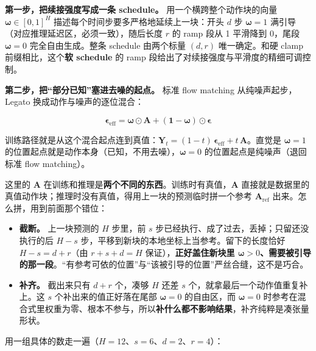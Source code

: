 \documentclass[
  chinese,
]{ctexart}
\providecommand{\tightlist}{%
  \setlength{\itemsep}{0pt}\setlength{\parskip}{0pt}}
\begin{document}
\textbf{第一步，把续接强度写成一条 schedule。}
用一个横跨整个动作块的向量 \(\boldsymbol{\omega} \in [0,1]^H\)
描述每个时间步要多严格地延续上一块：开头 \(d\) 步
\(\boldsymbol{\omega} = 1\) 满引导（对应推理延迟区，必须一致），随后长度
\(r\) 的 ramp 段从 1 平滑降到 0，尾段 \(\boldsymbol{\omega} = 0\)
完全自由生成。整条 schedule 由两个标量 \((d, r)\) 唯一确定。和硬 clamp
前缀相比，这个\textbf{软 schedule} 的 ramp
段给出了对续接强度与平滑度的精细可调控制。

\textbf{第二步，把``部分已知''塞进去噪的起点。} 标准 flow matching
从纯噪声起步，Legato 换成动作与噪声的逐位混合：

\[\boldsymbol{\epsilon}_{\mathrm{eff}} = \boldsymbol{\omega} \odot \mathbf{A} + (\mathbf{1} - \boldsymbol{\omega}) \odot \boldsymbol{\epsilon}\]

训练路径就是从这个混合起点连到真值：\(\mathbf{Y}_t = (1-t)\,\boldsymbol{\epsilon}_{\mathrm{eff}} + t\,\mathbf{A}\)。直觉是
\(\boldsymbol{\omega} = 1\)
的位置起点就是动作本身（已知，不用去噪），\(\boldsymbol{\omega} = 0\)
的位置起点是纯噪声（退回标准 flow matching）。

这里的 \(\mathbf{A}\)
在训练和推理是\textbf{两个不同的东西}。训练时有真值，\(\mathbf{A}\)
直接就是数据里的真值动作块；推理时没有真值，得用上一块的预测临时拼一个参考
\(\mathbf{A}_{\mathrm{ref}}\) 出来。怎么拼，用到前面那个错位：

\begin{itemize}
\tightlist
\item
  \textbf{截断。} 上一块预测的 \(H\) 步里，前 \(s\)
  步已经执行、成了过去，丢掉；只留还没执行的后 \(H-s\)
  步，平移到新块的本地坐标上当参考。留下的长度恰好 \(H - s = d + r\)（由
  \(r+s+d=H\) 保证），\textbf{正好盖住新块里
  \(\boldsymbol{\omega} > 0\)、需要被引导的那一段}。``有参考可依的位置''与``该被引导的位置''严丝合缝，这不是巧合。
\item
  \textbf{补齐。} 截出来只有 \(d+r\) 个，凑够 \(H\) 还差 \(s\)
  个，就拿最后一个动作值重复补上。这 \(s\) 个补出来的值正好落在尾部
  \(\boldsymbol{\omega} = 0\) 的自由区，而 \(\boldsymbol{\omega} = 0\)
  时参考在混合式里权重为零、根本不参与，所以\textbf{补什么都不影响结果}，补齐纯粹是凑张量形状。
\end{itemize}

用一组具体的数走一遍（\(H=12\)、\(s=6\)、\(d=2\)、\(r=4\)）：
\end{document}
